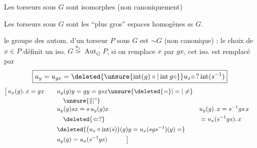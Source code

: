 
Les torseurs sous $G$ sont isomorphes (non canoniquement)

Les torseurs sous $G$ sont les ``plus gros'' espaces homogènes ss $G$.

le groupe des autom. d'un torseur $P$ sous $G$ est $\sim G$ (non canonique) : le choix de $x\in P$ définit un iso. $G\overset{u_x}{\simeq}\operatorname{Aut}_{G}P$, si on remplace $x$ par $gx$, cet iso. est remplacé par
\[
\boxed{u_y=u_{gx}=\deleted{\unsure{\operatorname{int}(g)\circ|\operatorname{int}g\circ}}u_x\circ\,?\operatorname{int}(s^{-1})}
\]
{\small
\[
\begin{aligned}
\bigl[\,u_x(g).\,x=gx\qquad &u_y(g)y=gy=gsx\unsure{\deleted{=}|=|\ne}\\
&\quad\unsure{\Vert|\text{''}}\\[-3pt]
&u_y(g)sx=s\,u_y(g)x\qquad &&u_y(g).\,x=s^{-1}gs\,x\\
&\hspace{1em}\deleted{\Leftarrow ?} &&=u_x(s^{-1}gs).\,x\\
&\deleted{\bigl(u_x\circ\operatorname{int}(s)\bigr)(g)y=u_x(sgs^{-1})(y)=}\\
&u_y(g)=u_x(s^{-1}gs)\hspace{3em}\bigr]
\end{aligned}
\]}
